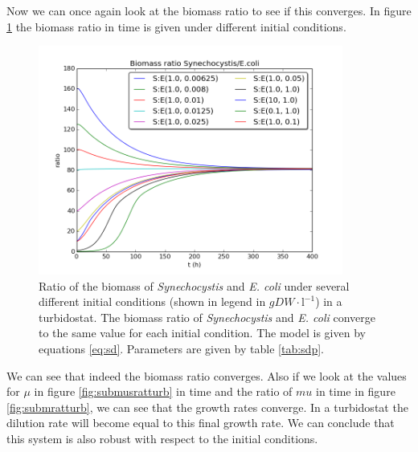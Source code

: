 \documentclass[12pt]{report}
\begin{document}

Now we can once again look at the biomass ratio to see if this converges. In figure \ref{fig:subratturb} the biomass ratio in time is given under different initial conditions.

\begin{figure}[!ht]
 \begin{center}  
     \includegraphics[width=10cm]{sub_dependent_turbidostat_bratio.png}
     \caption{Ratio of the biomass of \textit{Synechocystis} and \textit{E. coli} under several different initial conditions (shown in legend in $gDW\cdot \text{l}^{-1}$) in a turbidostat. The biomass ratio of \textit{Synechocystis} and \textit{E. coli} converge to the same value for each initial condition. The model is given by equations \ref{eq:sd}. Parameters are given by table \ref{tab:sdp}.}
    \label{fig:subratturb}
    \end{center}
\end{figure}

We can see that indeed the biomass ratio converges. Also if we look at the values for $\mu$ in figure \ref{fig:submusratturb} in time and the ratio of $mu$ in time in figure \ref{fig:submratturb}, we can see that the growth rates converge. In a turbidostat the dilution rate will become equal to this final growth rate. We can conclude that this system is also robust with respect to the initial conditions.
\end{document}
